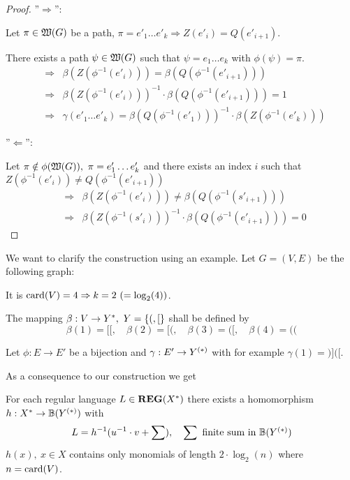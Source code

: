 \begin{proof}
''$\Rightarrow$'':

Let $\pi \in \mbox{$\mathfrak{W}({G})$}$ be a path, $\pi = e'_1 \ldots e'_k \Rightarrow Z(e'_i)
= Q(e'_{i+1})$.

There exists a path $\psi \in \mbox{$\mathfrak{W}({G})$}$ such that $\psi = e_1 \ldots e_k$
with $\phi(\psi) = \pi$.
\begin{eqnarray*}
&\Rightarrow& \beta(Z(\phi^{-1}(e'_i))) = \beta(Q(\phi^{-1}(e'_{i+1}))) \\
&\Rightarrow& \beta(Z(\phi^{-1}(e'_i)))^{-1} \cdot \beta(Q(\phi^{-1}(e'_{i+1})))
= 1 \\
&\Rightarrow& \gamma(e'_1 \ldots e'_k) = \beta(Q(\phi^{-1}(e'_1)))^{-1} \cdot
\beta(Z(\phi^{-1}(e'_k)))
\end{eqnarray*}

''$\Leftarrow$'':

Let $\pi \notin \phi(\mbox{$\mathfrak{W}({G})$}),\ \pi = e'_1 \ldots e'_k$ and there exists an
index $i$ such that $Z(\phi^{-1}(e'_i)) \neq Q(\phi^{-1}(e'_{i+1}))$
\begin{eqnarray*}
&\Rightarrow& \beta(Z(\phi^{-1}(e'_i))) \neq \beta(Q(\phi^{-1}(s'_{i+1}))) \\
&\Rightarrow& \beta(Z(\phi^{-1}(s'_i)))^{-1} \cdot \beta(Q(\phi^{-1}(e'_{i+1})))
= 0
\end{eqnarray*}
\end{proof}

We want to clarify the construction using an example. Let $G = (V, E)$ be the
following graph:

\begin{center}

\end{center}

It is $\mathrm{card}({V}) = 4 \Rightarrow k = 2\ (= \log_2(4))$.

The mapping $\beta: V \to Y^*,\ Y = \mbox{$\{(, [\}$}$ shall be defined by
\[ \beta(1) = [[,\quad \beta(2) = [(,\quad \beta(3) = ([,\quad \beta(4) = (( \]

Let $\phi : E \to E'$ be a bijection and $\gamma: E' \to \mbox{${Y}^{(*)}$}$ with for
example $\gamma(1) = )]([$.

As a consequence to our construction we get

\begin{theorem}
For each regular language $L \in \mbox{{\bf REG}}(X^*)$ there exists a homomorphism $h:
X^* \to \mathbb{B}(\mbox{${Y}^{(*)}$})$ with
\[ L = h^{-1}(u^{-1} \cdot v + \sum),\quad \sum \text{ finite sum in
}\mathbb{B}(\mbox{${Y}^{(*)}$}) \]
$h(x),\ x\in X$ contains only monomials of length $2 \cdot \log_2(n)$ where $n
= \mathrm{card}({V})$.
\end{theorem}

